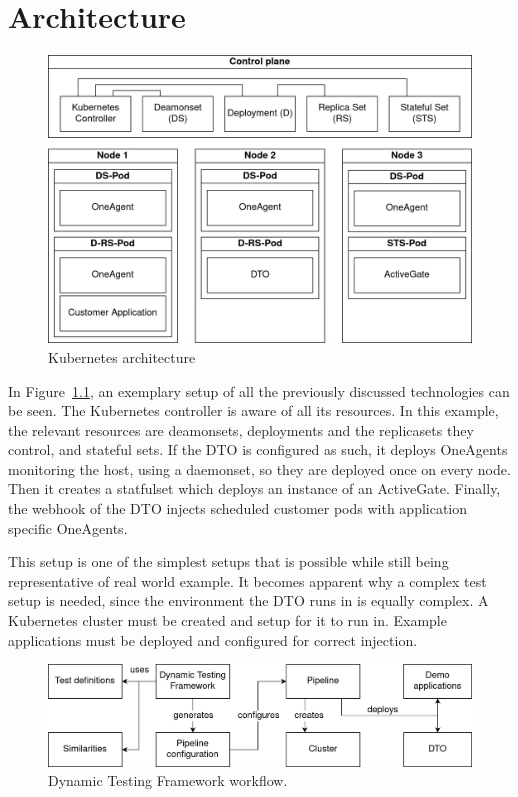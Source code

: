\chapter{Architecture}\label{ch:architecture}

\begin{figure}[h]
    \centering
    \includegraphics[width=\textwidth]{img/context/kubernetes}
    \caption{Kubernetes architecture}
    \label{fig:kubernetes-architecture}
\end{figure}

In Figure~\ref{fig:kubernetes-architecture}, an exemplary setup of all the previously discussed technologies can be seen.
The Kubernetes controller is aware of all its resources.
In this example, the relevant resources are deamonsets, deployments and the replicasets they control, and stateful sets.
If the DTO is configured as such, it deploys OneAgents monitoring the host, using a daemonset, so they are deployed once on every node.
Then it creates a statfulset which deploys an instance of an ActiveGate.
Finally, the webhook of the DTO injects scheduled customer pods with application specific OneAgents.

This setup is one of the simplest setups that is possible while still being representative of real world example.
It becomes apparent why a complex test setup is needed, since the environment the DTO runs in is equally complex.
A Kubernetes cluster must be created and setup for it to run in.
Example applications must be deployed and configured for correct injection.

\begin{figure}[H]
    \centering
    \includegraphics[width=\textwidth]{img/context/dtf}
    \caption{Dynamic Testing Framework workflow.}
    \label{fig:dtf-workflow}
\end{figure}

